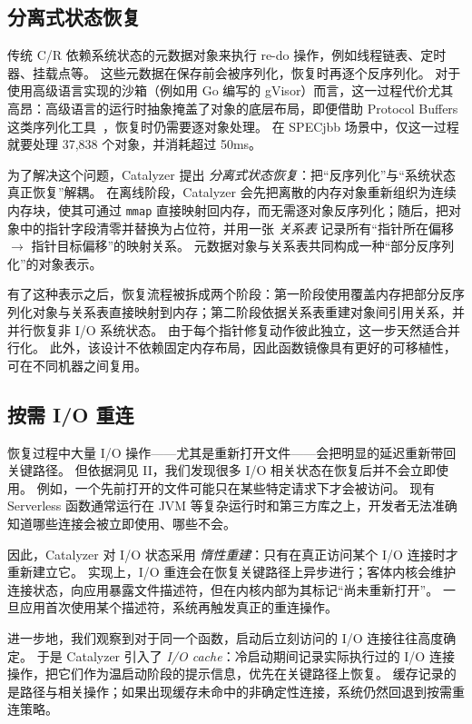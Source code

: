 \documentclass[letterpaper,twocolumn,10pt]{article}
\newcommand{\sys}{Catalyzer}
\begin{document}
\subsection{分离式状态恢复}\label{sec:separated-recovery}
传统 C/R 依赖系统状态的元数据对象来执行 re-do 操作，例如线程链表、定时器、挂载点等。
这些元数据在保存前会被序列化，恢复时再逐个反序列化。
对于使用高级语言实现的沙箱（例如用 Go 编写的 gVisor）而言，这一过程代价尤其高昂：高级语言的运行时抽象掩盖了对象的底层布局，即便借助 Protocol Buffers 这类序列化工具~\cite{r16}，恢复时仍需要逐对象处理。
在 SPECjbb 场景中，仅这一过程就要处理 37{,}838 个对象，并消耗超过 50ms。

为了解决这个问题，\sys{} 提出 \emph{分离式状态恢复}：把“反序列化”与“系统状态真正恢复”解耦。
在离线阶段，\sys{} 会先把离散的内存对象重新组织为连续内存块，使其可通过 \texttt{mmap} 直接映射回内存，而无需逐对象反序列化；随后，把对象中的指针字段清零并替换为占位符，并用一张 \emph{关系表} 记录所有“指针所在偏移 $\rightarrow$ 指针目标偏移”的映射关系。
元数据对象与关系表共同构成一种“部分反序列化”的对象表示。

有了这种表示之后，恢复流程被拆成两个阶段：第一阶段使用覆盖内存把部分反序列化对象与关系表直接映射到内存；第二阶段依据关系表重建对象间引用关系，并并行恢复非 I/O 系统状态。
由于每个指针修复动作彼此独立，这一步天然适合并行化。
此外，该设计不依赖固定内存布局，因此函数镜像具有更好的可移植性，可在不同机器之间复用。

\subsection{按需 I/O 重连}\label{sec:io-reconnect}
恢复过程中大量 I/O 操作——尤其是重新打开文件——会把明显的延迟重新带回关键路径。
但依据洞见 II，我们发现很多 I/O 相关状态在恢复后并不会立即使用。
例如，一个先前打开的文件可能只在某些特定请求下才会被访问。
现有 Serverless 函数通常运行在 JVM 等复杂运行时和第三方库之上，开发者无法准确知道哪些连接会被立即使用、哪些不会。

因此，\sys{} 对 I/O 状态采用 \emph{惰性重建}：只有在真正访问某个 I/O 连接时才重新建立它。
实现上，I/O 重连会在恢复关键路径上异步进行；客体内核会维护连接状态，向应用暴露文件描述符，但在内核内部为其标记“尚未重新打开”。
一旦应用首次使用某个描述符，系统再触发真正的重连操作。

进一步地，我们观察到对于同一个函数，启动后立刻访问的 I/O 连接往往高度确定。
于是 \sys{} 引入了 \emph{I/O cache}：冷启动期间记录实际执行过的 I/O 连接操作，把它们作为温启动阶段的提示信息，优先在关键路径上恢复。
缓存记录的是路径与相关操作；如果出现缓存未命中的非确定性连接，系统仍然回退到按需重连策略。
\end{document}
